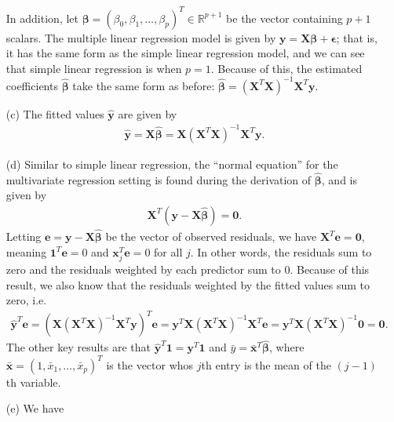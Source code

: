 \documentclass[10pt]{article}
\begin{document}
\begin{itemize}
    In addition, let \(\bm{\beta} = (\beta_0, \beta_1, \ldots, \beta_p)^T \in \mathbb{R}^{p+1}\) be the vector containing \(p+1\) scalars. 
    The multiple linear regression model is given by \(\mathbf{y} = \mathbf{X}\bm{\beta} + \bm{\epsilon}\); that is, it has the same form as the 
    simple linear regression model, and we can see that simple linear regression is when \(p=1\). Because of this, the estimated 
    coefficients \(\hat{\bm{\beta}}\) take the same form as before: \(\hat{\bm{\beta}} = (\mathbf{X}^T\mathbf{X})^{-1}\mathbf{X}^T\mathbf{y}\).
    \item[(c)] The fitted values \(\hat{\mathbf{y}}\) are given by 
    \begin{align*}
        \hat{\mathbf{y}} = \mathbf{X}\hat{\bm{\beta}} = \mathbf{X}(\mathbf{X}^T\mathbf{X})^{-1}\mathbf{X}^T\mathbf{y}.
    \end{align*}
    \item[(d)] Similar to simple linear regression, the ``normal equation'' for the multivariate regression setting is found during the derivation of 
    \(\hat{\bm{\beta}}\), and is given by 
    \begin{align*}
        \mathbf{X}^T (\mathbf{y} - \mathbf{X}\hat{\bm{\beta}}) = \mathbf{0}.
    \end{align*}
    Letting \(\mathbf{e} = \mathbf{y} - \mathbf{X}\hat{\bm{\beta}}\) be the vector of observed residuals,
    we have \(\mathbf{X}^T\mathbf{e} = \mathbf{0}\), meaning
    \(\mathbf{1}^T \mathbf{e} = 0\) and \(\mathbf{x}_j^T \mathbf{e} = 0\) for all \(j\). In other words, the residuals sum to zero and the residuals
    weighted by each predictor sum to 0. Because of this result, we also know that the residuals weighted by the fitted values sum to zero, i.e.
    \begin{align*}
        \hat{\mathbf{y}}^T \mathbf{e} = (\mathbf{X}(\mathbf{X}^T\mathbf{X})^{-1}\mathbf{X}^T\mathbf{y})^T\mathbf{e}
        = \mathbf{y}^T \mathbf{X} (\mathbf{X}^T\mathbf{X})^{-1} \mathbf{X}^T \mathbf{e}
        = \mathbf{y}^T \mathbf{X} (\mathbf{X}^T\mathbf{X})^{-1} \mathbf{0}
        = \mathbf{0}.
    \end{align*}
    The other key results are that \(\hat{\mathbf{y}}^T \mathbf{1} = \mathbf{y}^T\mathbf{1}\) and \(\bar{y} = \bar{\mathbf{x}}^T \hat{\bm{\beta}}\),
    where \(\bar{\mathbf{x}} = (1, \bar{x}_1, \ldots, \bar{x}_p)^T\) is the vector whos \(j\)th entry is the mean of the \((j-1)\)th variable. 
    \item[(e)] We have 

\end{itemize}
\end{document}
